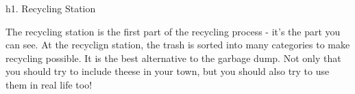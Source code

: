 h1. Recycling Station

The recycling station is the first part of the recycling process - it's the part you can see. At the recyclign station, the trash is sorted into many categories to make recycling possible. It is the best alternative to the garbage dump. Not only that you should try to include theese in your town, but you should also try to use them in real life too!
